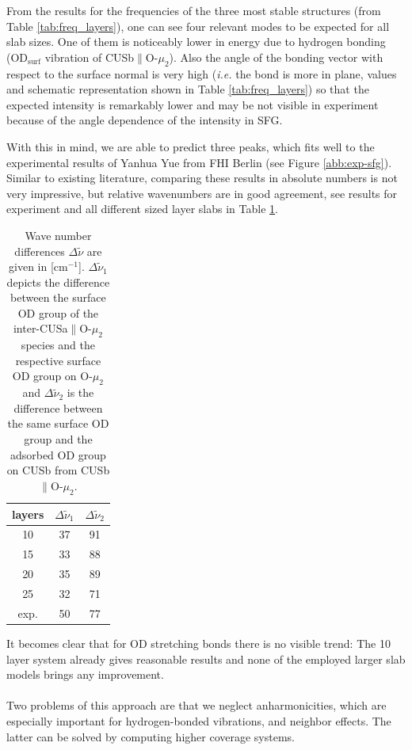 \documentclass[11pt,DIV=13,BCOR=5mm,a4paper,headinclude]{scrbook}
\begin{document}
From the results for the frequencies of the three most stable structures (from Table \ref{tab:freq_layers}), one can see four relevant modes to be expected for all slab sizes.
One of them is noticeably lower in energy due to hydrogen bonding (OD$_\textrm{surf}$ vibration of CUSb$\parallel$O-$\mu_2$).
Also the angle of the bonding vector with respect to the surface normal is very high (\textit{i.e.} the bond is more in plane, values and schematic representation shown in Table \ref{tab:freq_layers}) so that the expected intensity is remarkably lower and may be not visible in experiment because of the angle dependence of the intensity in SFG.


With this in mind, we are able to predict three peaks, which fits well to the experimental results of Yanhua Yue from FHI Berlin (see Figure \ref{abb:exp-sfg}).
Similar to existing literature\cite{Wirth2014}, comparing these results in absolute numbers is not very impressive, but relative wavenumbers are in good agreement, see results for experiment and all different sized layer slabs in Table \ref{tab:rel_modes}.
\begin{table}[!h]
\begin{center}
\caption{Wave number differences $\Delta \tilde{\nu}$ are given in [cm$^{-1}$].
$\Delta \tilde{\nu}_1$ depicts the difference between the surface OD group of the inter-CUSa$\parallel$O-$\mu_2$ species and the respective surface OD group on O-$\mu_2$ and  $\Delta \tilde{\nu}_2$ is the difference between the same surface OD group and the adsorbed OD group on CUSb from CUSb$\parallel$O-$\mu_2$.}
\begin{tabular}{ccc}
\toprule
layers & $\Delta \tilde{\nu}_1$ &  $\Delta \tilde{\nu}_2$\\\midrule
10  &37 &91 \\
15  &33 &88 \\
20  &35 &89 \\
25  &32 &71 \\\midrule
exp.&50 &77 \\\bottomrule
  \end{tabular}
\label{tab:rel_modes}
\end{center}
\end{table}
It becomes clear that for OD stretching bonds there is no visible trend: The 10 layer system already gives reasonable results and none of the employed larger slab models brings any improvement.
\\
\\

Two problems of this approach are that we neglect anharmonicities, which are especially important for hydrogen-bonded vibrations, and neighbor effects.
The latter can be solved by computing higher coverage systems.
\end{document}
